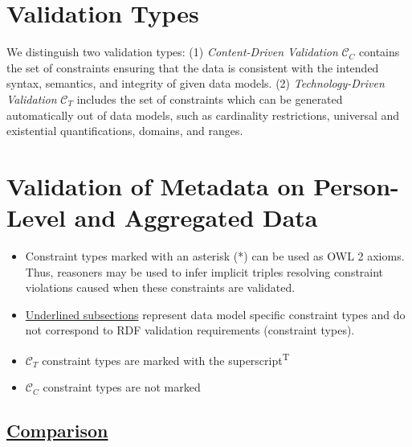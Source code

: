 \documentclass{llncs}
\newcommand{\udash}[1]{%
    \tikz[baseline=(todotted.base)]{
        \node[inner sep=1pt,outer sep=0pt] (todotted) {#1};
        \draw[dashed] (todotted.south west) -- (todotted.south east);
    }%
}%
\begin{document}
\section{Validation Types}

We distinguish two validation types:
(1) \emph{Content-Driven Validation} $\mathcal{C}_{C}$ contains the set of constraints ensuring that the data is consistent with the intended syntax, semantics, and integrity of given data models.
(2) \emph{Technology-Driven Validation} $\mathcal{C}_{T}$ includes the set of constraints which can be generated automatically out of data models, such as cardinality restrictions, universal and existential quantifications, domains, and ranges.

\section{Validation of Metadata on Person-Level and Aggregated Data}

\begin{itemize}
  \item Constraint types marked with an asterisk (*) can be used as OWL 2 axioms. Thus, reasoners may be used to infer implicit triples resolving constraint violations caused when these constraints are validated.
	\item \underline{Underlined subsections} represent data model specific constraint types and do not correspond to RDF validation requirements (constraint types).
	\item $\mathcal{C}_{T}$ constraint types are marked with the superscript\textsuperscript{T}
	\item $\mathcal{C}_{C}$ constraint types are not marked
\end{itemize}

\subsection{\underline{Comparison}}
\end{document}
